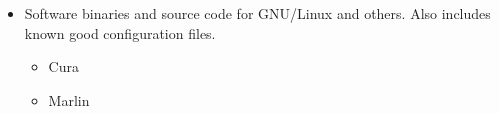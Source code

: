 \begin{itemize}
\item Software binaries and source code for GNU/Linux and others. Also includes known good configuration files.
\begin{itemize} %
\item{Cura}
\item Marlin
\end{itemize} %

\end{itemize}

